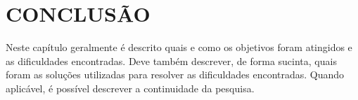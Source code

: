 \chapter{CONCLUSÃO}
\label{conclusao}
Neste capítulo geralmente é descrito quais e como os objetivos foram atingidos e as dificuldades encontradas. Deve também descrever, de forma sucinta, quais foram as soluções utilizadas para resolver as dificuldades encontradas. Quando aplicável, é possível descrever a continuidade da pesquisa.